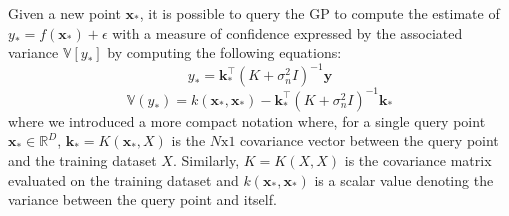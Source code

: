 Given a new point $\mathbf{x}_*$, it is possible to query the GP to compute the estimate of $y_*=f(\mathbf{x}_*)+\epsilon$ with a measure of confidence expressed by the associated variance $\mathbb{V}[y_*]$ by computing the following equations:
$$
y_*=\mathbf{k}_*^\top(K+\sigma_n^2I)^{-1}\mathbf{y}
$$
$$
\mathbb{V}(y_*)=k(\mathbf{x}_*,\mathbf{x}_*)-\mathbf{k}_*^\top(K+\sigma_n^2I)^{-1}\mathbf{k}_*
$$
where we introduced a more compact notation where, for a single query point $\mathbf{x}_*\in\mathbb{R}^D$, $\mathbf{k}_*=K(\mathbf{x}_*,X)$ is the $N\text{x}1$ covariance vector between the query point and the training dataset $X$. Similarly, $K=K(X,X)$ is the covariance matrix evaluated on the training dataset and $k(\mathbf{x}_*,\mathbf{x}_*)$ is a scalar value denoting the variance between the query point and itself. 


























